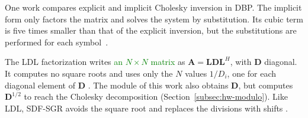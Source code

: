 One work compares explicit and implicit Cholesky inversion in DBP.
The implicit form only factors the matrix and solves the system by substitution. Its cubic term is five times smaller than that of the explicit inversion, but the substitutions are performed for each symbol~\cite{li-tradeofs}.

The LDL factorization writes \textcolor{GREEN}{an $N \times N$ matrix} as $\mathbf A = \mathbf L\mathbf D\mathbf L^H$, with $\mathbf D$ diagonal. It computes no square roots and uses only the $N$ values $1/D_i$, one for each diagonal element of $\mathbf D$ \cite{ingemarsson2016ldl}. The module of this work also obtains $\mathbf D$, but computes $\mathbf D^{1/2}$ to reach the Cholesky decomposition (Section~\ref{subsec:hw-modulo}). Like LDL, SDF-SGR avoids the square root and replaces the divisions with shifts \cite{yu2015inversion}.
